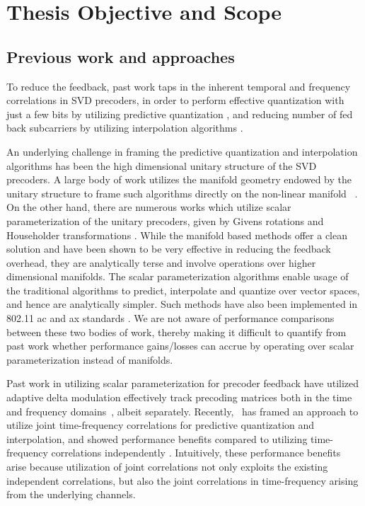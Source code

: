 \documentclass[11pt,a4paper]{report}
\begin{document}
\section{Thesis Objective and Scope}
\subsection{Previous work and approaches}
To reduce the feedback, past work taps in the inherent temporal and frequency correlations in SVD precoders, in order to perform effective quantization with just a few bits by utilizing predictive quantization \cite{Gupt1905:Predictive,6891198,7370793,sacristan2010differential,5946308,6545375,4114278,4556174}, and reducing number of fed back subcarriers by utilizing interpolation algorithms \cite{Gupt1905:Predictive,5671092,khaled2005quantized}.

An underlying challenge in framing the predictive quantization and interpolation algorithms has been the high dimensional unitary structure of the SVD precoders. A large body of work utilizes the manifold geometry endowed by the unitary structure to frame such algorithms directly on the non-linear manifold ~\cite{schwarz2013adaptive,5946308,6891198,Gupt1905:Predictive,pitaval2013codebooks}. On the other hand, there are numerous works which utilize scalar parameterization of the unitary precoders, given by Givens rotations and Householder transformations \cite{4114278,4556174,lou2013comparison}. While the manifold based methods offer a clean solution and have been shown to be very effective in reducing the feedback overhead, they are analytically terse and
involve operations over higher dimensional manifolds. The scalar parameterization algorithms enable usage of the traditional algorithms to predict, interpolate and quantize over vector spaces, and hence are analytically simpler.
Such methods have also been implemented in 802.11 ac and ax standards
\cite{lou2013comparison,ieee80211}. We are not aware of performance comparisons
between these two bodies of work, thereby making it difficult to
quantify from past work whether performance gains/losses can accrue by operating over scalar parameterization instead of manifolds.


Past work in utilizing scalar parameterization for precoder feedback 
have utilized adaptive delta modulation effectively track precoding 
matrices both in the time~\cite{4114278} and frequency domains~\cite{4556174}, 
albeit separately. Recently,~\cite{Gupt1905:Predictive} has framed an
approach to utilize joint time-frequency correlations for predictive
quantization and interpolation, and showed performance benefits
compared to utilizing time-frequency correlations independently
\cite{6891198,khaled2005quantized}.  Intuitively, these performance
benefits arise because utilization of joint correlations not only
exploits the existing independent correlations, but also the joint
correlations in time-frequency arising from the underlying channels.
\end{document}
